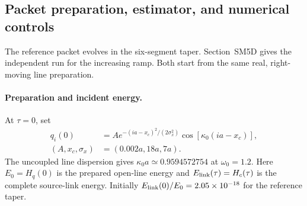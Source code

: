 \documentclass[10pt,aps,onecolumn,notitlepage,nofootinbib]{revtex4-2}
\begin{document}
\subsection{Packet preparation, estimator, and numerical controls}
\label{sec:sm-packet-controls}

The reference packet evolves in the six-segment taper. Section~SM5D gives the independent run for the increasing ramp. Both start from the same real, right-moving line preparation.

\paragraph*{Preparation and incident energy.}
At $\tau=0$, set
\begin{equation*}
 \begin{aligned}
 q_i(0)&=A e^{-(ia-x_c)^2/(2\sigma_x^2)}\cos[\kappa_0(ia-x_c)],\\
 (A,x_c,\sigma_x)&=(0.002a,18a,7a).
 \end{aligned}
 \tag{SM5Ca}\label{eq:s7-packet}
\end{equation*}
The uncoupled line dispersion gives $\kappa_0a\simeq0.9594572754$ at $\omega_0=1.2$. Here $E_0=H_q(0)$ is the prepared open-line energy and $E_{\rm link}(\tau)=H_c(\tau)$ is the complete source-link energy. Initially $E_{\rm link}(0)/E_0=2.05\times10^{-18}$ for the reference taper.
\end{document}
